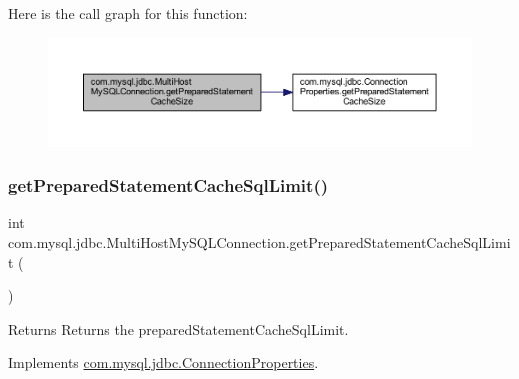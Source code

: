 Here is the call graph for this function\+:
\nopagebreak
\begin{figure}[H]
\begin{center}
\leavevmode
\includegraphics[width=350pt]{classcom_1_1mysql_1_1jdbc_1_1_multi_host_my_s_q_l_connection_a6308b3767baa0f4cbf8eecdd7991533d_cgraph}
\end{center}
\end{figure}
\mbox{\label{classcom_1_1mysql_1_1jdbc_1_1_multi_host_my_s_q_l_connection_a183bd1cac2423d1b6c228c310cb6d43b}} 
\subsubsection{\texorpdfstring{get\+Prepared\+Statement\+Cache\+Sql\+Limit()}{getPreparedStatementCacheSqlLimit()}}
{\footnotesize\ttfamily int com.\+mysql.\+jdbc.\+Multi\+Host\+My\+S\+Q\+L\+Connection.\+get\+Prepared\+Statement\+Cache\+Sql\+Limit (\begin{DoxyParamCaption}{ }\end{DoxyParamCaption})}

\begin{DoxyReturn}{Returns}
Returns the prepared\+Statement\+Cache\+Sql\+Limit. 
\end{DoxyReturn}


Implements \mbox{\hyperlink{interfacecom_1_1mysql_1_1jdbc_1_1_connection_properties_a4bcee0f0e555dcada01589d7b4168a4e}{com.\+mysql.\+jdbc.\+Connection\+Properties}}.

